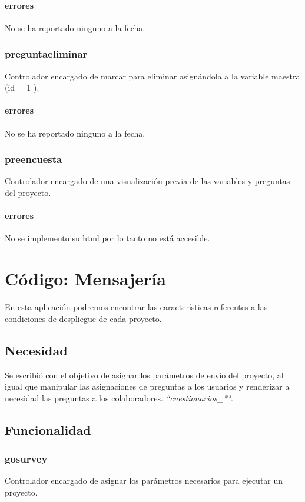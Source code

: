 \documentclass[10pt,a4paper]{book}
\begin{document}
	\subsubsection{errores}
	No se ha reportado ninguno a la fecha.

	\subsection{preguntaeliminar}
	Controlador encargado de marcar para eliminar asignándola a la variable maestra (id = 1 ).
	\subsubsection{errores}
	No se ha reportado ninguno a la fecha.

	\subsection{preencuesta}
	Controlador encargado de una visualización previa de las variables y preguntas del proyecto.
	\subsubsection{errores}
	No se implemento su html por lo tanto no está accesible.


	\chapter{Código: Mensajería}

	En esta aplicación podremos encontrar las características referentes a las condiciones de despliegue de cada proyecto.

	\section{Necesidad}

	Se escribió con el objetivo de asignar los parámetros de envío del proyecto, al igual que manipular las asignaciones de preguntas a los usuarios y renderizar a necesidad las preguntas a los colaboradores. \textit{``cuestionarios\_*"}.

	\section{Funcionalidad}

	\subsection{gosurvey}
	Controlador encargado de asignar los parámetros necesarios para ejecutar un proyecto.
\end{document}
